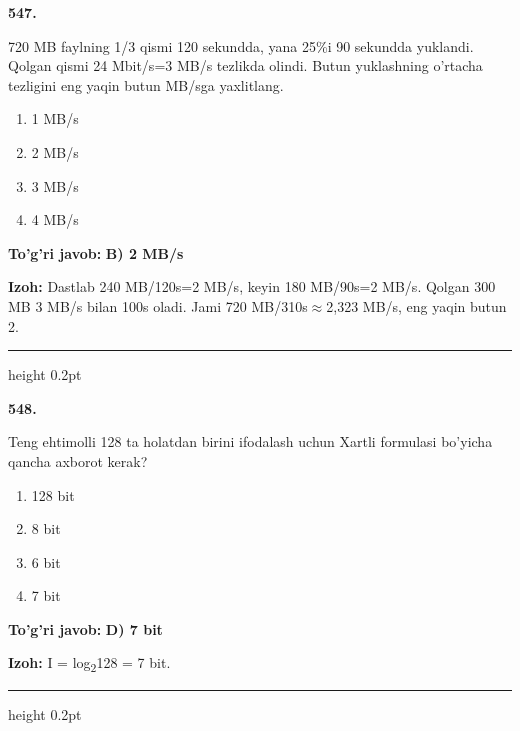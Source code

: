 \documentclass[10pt,a4paper,oneside]{article}
\begin{document}
\noindent\textbf{\color{ink}547.}
\par
720 MB faylning 1/3 qismi 120 sekundda, yana 25\%i 90 sekundda yuklandi. Qolgan qismi 24 Mbit/s=3 MB/s tezlikda olindi. Butun yuklashning o'rtacha tezligini eng yaqin butun MB/sga yaxlitlang.
\begin{enumerate}[label=\Alph*),leftmargin=9mm]
\item 1 MB/s
\item 2 MB/s
\item 3 MB/s
\item 4 MB/s
\end{enumerate}
\begin{tcolorbox}[enhanced,breakable,colback=teal!4,colframe=teal!50!black,boxrule=0.5pt,arc=1.1mm,left=3mm,right=3mm,top=1.7mm,bottom=1.7mm,before skip=2mm,after skip=2mm]
\textbf{\color{teal}To'g'ri javob:} \textbf{B) 2 MB/s}
\par\smallskip
\textbf{Izoh:} Dastlab 240 MB/120s=2 MB/s, keyin 180 MB/90s=2 MB/s. Qolgan 300 MB 3 MB/s bilan 100s oladi. Jami 720 MB/310s\ensuremath{\approx}2,323 MB/s, eng yaqin butun 2.
\end{tcolorbox}
\vspace{2mm}\hrule height 0.2pt \vspace{3mm}

\noindent\textbf{\color{ink}548.}
\par
Teng ehtimolli 128 ta holatdan birini ifodalash uchun Xartli formulasi bo'yicha qancha axborot kerak?
\begin{enumerate}[label=\Alph*),leftmargin=9mm]
\item 128 bit
\item 8 bit
\item 6 bit
\item 7 bit
\end{enumerate}
\begin{tcolorbox}[enhanced,breakable,colback=teal!4,colframe=teal!50!black,boxrule=0.5pt,arc=1.1mm,left=3mm,right=3mm,top=1.7mm,bottom=1.7mm,before skip=2mm,after skip=2mm]
\textbf{\color{teal}To'g'ri javob:} \textbf{D) 7 bit}
\par\smallskip
\textbf{Izoh:} I = log\textsubscript{2}128 = 7 bit.
\end{tcolorbox}
\vspace{2mm}\hrule height 0.2pt \vspace{3mm}
\end{document}
